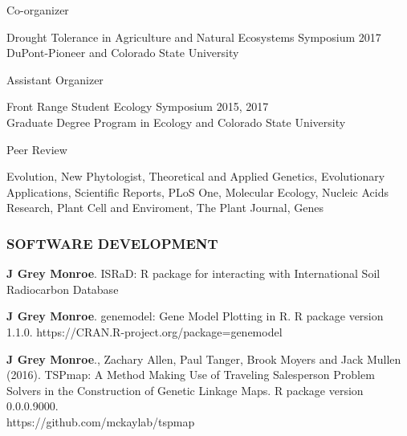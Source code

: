\documentclass[12pt,english]{article}
\begin{document}
\hspace*{1.0em} Co-organizer
\par
\hspace*{2.0em} Drought Tolerance in Agriculture and Natural Ecosystems Symposium
\hfill
2017
\hspace*{2.0em} DuPont-Pioneer and Colorado State University
\par
\vspace{0.5em}
\hspace*{1.0em} Assistant Organizer
\par
\hspace*{2.0em} Front Range Student Ecology Symposium
\hfill
2015, 2017\\
\hspace*{2.0em} Graduate Degree Program in Ecology and Colorado State University
\par
\hspace*{1.0em} Peer Review
\par
\hspace*{2.0em} Evolution, New Phytologist, Theoretical and Applied Genetics, Evolutionary Applications, Scientific Reports, PLoS One, Molecular Ecology, Nucleic Acids Research, Plant Cell and Enviroment, The Plant Journal, Genes

\vspace{0.5em}\par



\subsubsection*{SOFTWARE DEVELOPMENT}
\vspace{-0.5ex}

\begin{hangparas}{.5in}{1}
\hspace{1em}\textbf{J Grey Monroe}. ISRaD: R package for interacting with International Soil Radiocarbon Database\vspace{0.5ex}\par
\hspace{1em}\textbf{J Grey Monroe}. genemodel: Gene Model Plotting in R. R package version 1.1.0.
  https://CRAN.R-project.org/package=genemodel
\vspace{0.5ex}\par
\hspace{1em}\textbf{J Grey Monroe}., Zachary Allen, Paul Tanger, Brook Moyers and Jack Mullen (2016). TSPmap: A Method Making Use of Traveling Salesperson Problem Solvers in the Construction of Genetic Linkage Maps. R package version 0.0.0.9000. \\https://github.com/mckaylab/tspmap

\end{hangparas}
\end{document}
